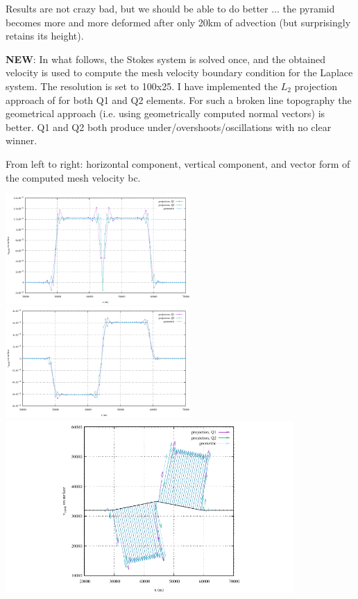 Results are not crazy bad, but we should be able to do better ... the pyramid 
becomes more and more deformed after only 20km of advection (but surprisingly retains its height). 



{\bf NEW}: In what follows, the Stokes system is solved once, and the obtained velocity
is used to compute the mesh velocity boundary condition for the Laplace system. 
The resolution is set to 100x25. I have implemented the $L_2$ projection approach 
of \cite{robh17} for both Q1 and Q2 elements. For such a broken line topography the 
geometrical approach (i.e. using geometrically computed normal vectors) is better.
Q1 and Q2 both produce under/overshoots/oscillations with no clear winner. 

From left to right: horizontal component, vertical component, and vector form 
of the computed mesh velocity bc.

\begin{center}
\includegraphics[width=7cm]{python_codes/fieldstone_54/images/exp8/100x25/umesh}
\includegraphics[width=7cm]{python_codes/fieldstone_54/images/exp8/100x25/vmesh}\\
\includegraphics[width=11cm]{python_codes/fieldstone_54/images/exp8/100x25/velmesh}
\end{center}

